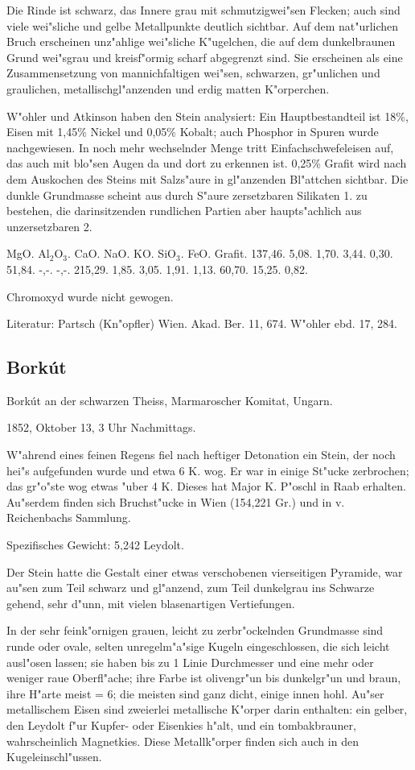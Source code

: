\documentclass[a4paper, 11pt, oneside]{article}
\begin{document}
Die Rinde ist schwarz, das Innere grau mit schmutzigwei"sen Flecken; auch sind viele wei"sliche und gelbe Metallpunkte deutlich sichtbar. Auf dem nat"urlichen Bruch erscheinen unz"ahlige wei"sliche K"ugelchen, die auf dem dunkelbraunen Grund wei"sgrau und kreisf"ormig scharf abgegrenzt sind. Sie erscheinen als eine Zusammensetzung von mannichfaltigen wei"sen, schwarzen, gr"unlichen und graulichen, metallischgl"anzenden und erdig matten K"orperchen.

W"ohler und Atkinson haben den Stein analysiert: Ein Hauptbestandteil ist 18\%, Eisen mit 1,45\% Nickel und 0,05\% Kobalt; auch Phosphor in Spuren wurde nachgewiesen. In noch mehr wechselnder Menge tritt Einfachschwefeleisen auf, das auch mit blo"sen Augen da und dort zu erkennen ist. 0,25\% Grafit wird nach dem Auskochen des Steins mit Salzs"aure in gl"anzenden Bl"attchen sichtbar. Die dunkle Grundmasse scheint aus durch S"aure zersetzbaren Silikaten 1. zu bestehen, die darinsitzenden rundlichen Partien aber haupts"achlich aus unzersetzbaren 2.

MgO. Al$_{2}$O$_{3}$. CaO. NaO. KO. SiO$_{3}$. FeO. Grafit.  
1\. 37,46. 5,08. 1,70. 3,44. 0,30. 51,84. -,-. -,-.  
2\. 15,29. 1,85. 3,05. 1,91. 1,13. 60,70. 15,25. 0,82.

Chromoxyd wurde nicht gewogen.

Literatur: Partsch (Kn"opfler) Wien. Akad. Ber. 11, 674. W"ohler ebd. 17, 284.

\subsection{Borkút}

Borkút an der schwarzen Theiss, Marmaroscher Komitat, Ungarn.

1852, Oktober 13, 3 Uhr Nachmittags.

W"ahrend eines feinen Regens fiel nach heftiger Detonation ein Stein, der noch hei"s aufgefunden wurde und etwa 6 K. wog. Er war in einige St"ucke zerbrochen; das gr"o"ste wog etwas "uber 4 K. Dieses hat Major K. P"oschl in Raab erhalten. Au"serdem finden sich Bruchst"ucke in Wien (154,221 Gr.) und in v. Reichenbachs Sammlung.

Spezifisches Gewicht: 5,242 Leydolt.

Der Stein hatte die Gestalt einer etwas verschobenen vierseitigen Pyramide, war au"sen zum Teil schwarz und gl"anzend, zum Teil dunkelgrau ins Schwarze gehend, sehr d"unn, mit vielen blasenartigen Vertiefungen.

In der sehr feink"ornigen grauen, leicht zu zerbr"ockelnden Grundmasse sind runde oder ovale, selten unregelm"a"sige Kugeln eingeschlossen, die sich leicht ausl"osen lassen; sie haben bis zu 1 Linie Durchmesser und eine mehr oder weniger raue Oberfl"ache; ihre Farbe ist olivengr"un bis dunkelgr"un und braun, ihre H"arte meist = 6; die meisten sind ganz dicht, einige innen hohl. Au"ser metallischem Eisen sind zweierlei metallische K"orper darin enthalten: ein gelber, den Leydolt f"ur Kupfer- oder Eisenkies h"alt, und ein tombakbrauner, wahrscheinlich Magnetkies. Diese Metallk"orper finden sich auch in den Kugeleinschl"ussen.
\end{document}
